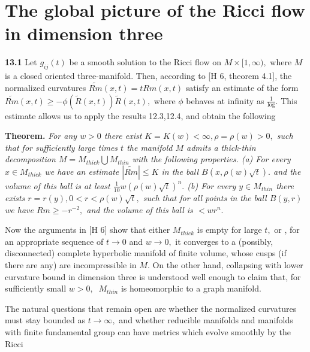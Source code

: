 \documentclass[12pt]{article}
\theoremstyle{plain}
{\swapnumbers
\newtheorem{thm}{Theorem}[section]
\newtheorem{cor}[thm]{Corollary}
\newtheorem{lem}[thm]{Lemma}
\newtheorem{prop}[thm]{Proposition}
}
\theoremstyle{definition}
{\swapnumbers
\newtheorem{defn}[thm]{Definition}
\newtheorem{nota}[thm]{Notation}
\newtheorem{parag}[thm]{}
\newtheorem*{parstr}{\addtocounter{thm}{1}\thesection.\arabic{thm}*}
\newtheorem*{intropar}{\addtocounter{thm}{1}\arabic{thm}}
}
\theoremstyle{remark} {\swapnumbers
\newtheorem{rem}[thm]{Remark}
\newtheorem{exam}[thm]{Example}
\newtheorem{lemma}[thm]{Lemma}
\newtheorem{claim}[thm]{Claim}
}
\numberwithin{equation}{section}
\begin{document}
            \section {The global picture of the Ricci flow in
            dimension three}
            \par {\bf 13.1} Let $g_{ij}(t)$ be a smooth solution to the Ricci
            flow on $M\times [1,\infty),$ where $M$ is a closed
            oriented three-manifold. Then, according to [H 6, theorem 4.1], the
            normalized curvatures $\tilde{Rm}(x,t)=tRm(x,t)$ satisfy an estimate of the
            form $\tilde{Rm}(x,t)\ge
            -\phi(\tilde{R}(x,t))\tilde{R}(x,t),$ where $\phi$
            behaves at infinity as $\frac{1}{\mbox{log}}.$ This
            estimate allows us to apply the results 12.3,12.4, and
            obtain the following  \par {\bf Theorem.} {\it For any $w>0$
            there exist $K=K(w)<\infty , \rho=\rho(w)>0,$ such
            that for sufficiently large times $t$ the manifold $M$
            admits a thick-thin decomposition $M=M_{thick}\bigcup
            M_{thin}$ with the following properties. (a) For every
            $x\in M_{thick}$ we have an estimate $|\tilde{Rm}|\le
            K$ in the ball $B(x,\rho(w)\sqrt{t}).$ and the volume
            of this ball is at least $\frac{1}{10}w(\rho(w)\sqrt{t})^n.$  (b) For every
            $y\in M_{thin}$ there exists $r=r(y),
            0<r<\rho(w)\sqrt{t},$ such that for all points in the
            ball $B(y,r)$ we have $Rm\ge -r^{-2},$ and the volume
            of this ball is $<wr^n.$} \par Now the arguments in
            [H 6] show that either $M_{thick}$ is empty for large
            $t,$ or , for an appropriate sequence of $t\to 0$ and
            $w\to 0,$ it converges to a (possibly, disconnected)
            complete hyperbolic manifold of finite volume, whose
            cusps (if there are any) are incompressible in $M.$ On
            the other hand, collapsing with lower curvature bound
            in dimension three is understood well enough to claim
            that, for sufficiently small $w>0,$ $\  M_{thin}$ is homeomorphic to a graph
            manifold. \par The natural questions that remain open
            are whether the normalized curvatures must stay
            bounded as $t\to \infty,$ and whether reducible
            manifolds and manifolds with finite  fundamental group
            can have metrics which evolve smoothly by the Ricci
\end{document}

